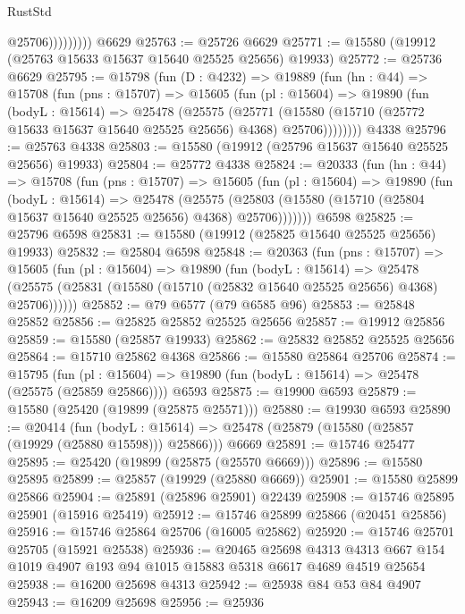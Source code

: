 \begin{lexlean}{RustStd}
\begin{coremodule}
                      @25706)))))))))
    @6629
@25763 := @25726 @6629
@25771 := @15580 (@19912 (@25763 @15633 @15637 @15640 @25525 @25656) @19933)
@25772 := @25736 @6629
@25795 := @15798
    (fun (D : @4232) =>
    @19889
      (fun (hn : @44) =>
      @15708
        (fun (pns : @15707) =>
        @15605
          (fun (pl : @15604) =>
          @19890
            (fun (bodyL : @15614) =>
            @25478
              (@25575
                (@25771
                  (@15580 (@15710 (@25772 @15633 @15637 @15640 @25525 @25656) @4368) @25706))))))))
    @4338
@25796 := @25763 @4338
@25803 := @15580 (@19912 (@25796 @15637 @15640 @25525 @25656) @19933)
@25804 := @25772 @4338
@25824 := @20333
    (fun (hn : @44) =>
    @15708
      (fun (pns : @15707) =>
      @15605
        (fun (pl : @15604) =>
        @19890
          (fun (bodyL : @15614) =>
          @25478
            (@25575
              (@25803 (@15580 (@15710 (@25804 @15637 @15640 @25525 @25656) @4368) @25706)))))))
    @6598
@25825 := @25796 @6598
@25831 := @15580 (@19912 (@25825 @15640 @25525 @25656) @19933)
@25832 := @25804 @6598
@25848 := @20363
    (fun (pns : @15707) =>
    @15605
      (fun (pl : @15604) =>
      @19890
        (fun (bodyL : @15614) =>
        @25478 (@25575 (@25831 (@15580 (@15710 (@25832 @15640 @25525 @25656) @4368) @25706))))))
@25852 := @79 @6577 (@79 @6585 @96)
@25853 := @25848 @25852
@25856 := @25825 @25852 @25525 @25656
@25857 := @19912 @25856
@25859 := @15580 (@25857 @19933)
@25862 := @25832 @25852 @25525 @25656
@25864 := @15710 @25862 @4368
@25866 := @15580 @25864 @25706
@25874 := @15795
    (fun (pl : @15604) => @19890 (fun (bodyL : @15614) => @25478 (@25575 (@25859 @25866))))
    @6593
@25875 := @19900 @6593
@25879 := @15580 (@25420 (@19899 (@25875 @25571)))
@25880 := @19930 @6593
@25890 := @20414
    (fun (bodyL : @15614) => @25478 (@25879 (@15580 (@25857 (@19929 (@25880 @15598))) @25866)))
    @6669
@25891 := @15746 @25477
@25895 := @25420 (@19899 (@25875 (@25570 @6669)))
@25896 := @15580 @25895
@25899 := @25857 (@19929 (@25880 @6669))
@25901 := @15580 @25899 @25866
@25904 := @25891 (@25896 @25901) @22439
@25908 := @15746 @25895 @25901 (@15916 @25419)
@25912 := @15746 @25899 @25866 (@20451 @25856)
@25916 := @15746 @25864 @25706 (@16005 @25862)
@25920 := @15746 @25701 @25705 (@15921 @25538)
@25936 := @20465
    @25698
    @4313
    @4313
    @667
    @154
    @1019
    @4907
    @193
    @94
    @1015
    @15883
    @5318
    @6617
    @4689
    @4519
    @25654
@25938 := @16200 @25698 @4313
@25942 := @25938 @84 @53 @84 @4907
@25943 := @16209 @25698
@25956 := @25936

\end{coremodule}
\end{lexlean}
